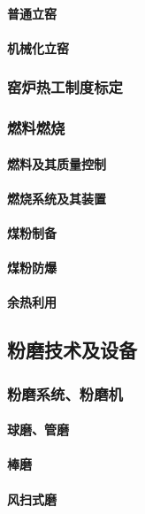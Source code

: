 \documentclass[UTF8]{../../ApplicationUniverse}
\begin{document}
            \paragraph{普通立窑}
            \paragraph{机械化立窑}
        \subsubsection{窑炉热工制度标定}
        \subsubsection{燃料燃烧}
            \paragraph{燃料及其质量控制}
            \paragraph{燃烧系统及其装置}
            \paragraph{煤粉制备}
            \paragraph{煤粉防爆}
            \paragraph{余热利用}
    \subsection{粉磨技术及设备}
        \subsubsection{粉磨系统、粉磨机}
            \paragraph{球磨、管磨}
            \paragraph{棒磨}
            \paragraph{风扫式磨}
\end{document}
